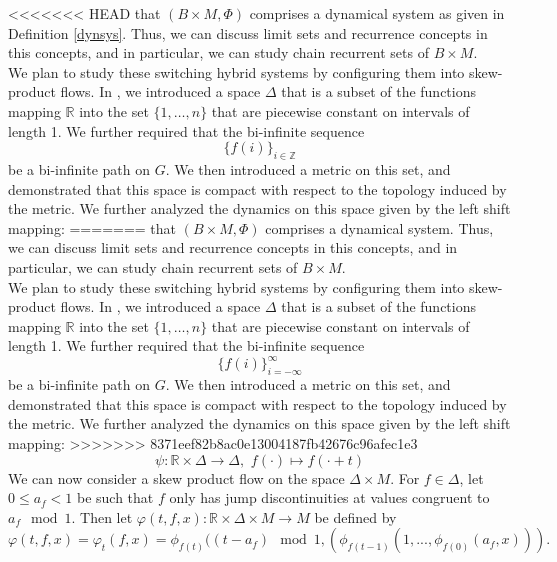 \documentclass[11pt]{article}
\begin{document}
<<<<<<< HEAD
that $(B\times M, \Phi)$ comprises a dynamical system as given in Definition \ref{dynsys}.  Thus, we can discuss limit sets and recurrence concepts in this concepts, and in particular, we can study chain recurrent sets of $B\times M$. \\
\indent We plan to study these switching hybrid systems by configuring them into skew-product flows.  In \cite{Ayers2013}, we introduced a space $\Delta$ that is a subset of the functions mapping $\mathbb{R}$ into the set $\{1,\ldots,n\}$ that are piecewise constant on intervals of length 1. We further required that the bi-infinite sequence 
$$\{f(i)\}_{i\in\mathbb{Z}}$$ 
be a bi-infinite path on $G$.  We then introduced a metric on this set, and demonstrated that this space is compact with respect to the topology induced by the metric.  We further analyzed the dynamics on this space given by the left shift mapping:
=======
that $(B\times M, \Phi)$ comprises a dynamical system.  Thus, we can discuss limit sets and recurrence concepts in this concepts, and in particular, we can study chain recurrent sets of $B\times M$. \\
\indent We plan to study these switching hybrid systems by configuring them into skew-product flows.  In \cite{Ayers2013}, we introduced a space $\Delta$ that is a subset of the functions mapping $\mathbb{R}$ into the set $\{1,\ldots,n\}$ that are piecewise constant on intervals of length 1. We further required that the bi-infinite sequence $$\{f(i)\}_{i=-\infty}^\infty$$ be a bi-infinite path on $G$.  We then introduced a metric on this set, and demonstrated that this space is compact with respect to the topology induced by the metric.  We further analyzed the dynamics on this space given by the left shift mapping:
>>>>>>> 8371eef82b8ac0e13004187fb42676c96afec1e3
$$\psi:\mathbb{R}\times\Delta\rightarrow\Delta,\,\, f(\cdot)\mapsto f(\cdot+ t)$$
We can now consider a skew product flow on the space $\Delta\times M$.  For $f \in \Delta$, let $0\leq a_f<1$ be such that $f$ only has jump discontinuities at values congruent to $a_f\mod 1$.  Then let $\varphi(t,f,x):\mathbb{R} \times \Delta\times M \rightarrow M$ be defined by
\begin{equation}\label{varphi}
\varphi (t,f,x) = \varphi_t(f,x)= \phi_{f(t)}((t-a_f)\mod1,(\phi_{f(t-1)}(1,...,\phi_{f(0)}(a_f,x))). 
\end{equation}
\end{document}
